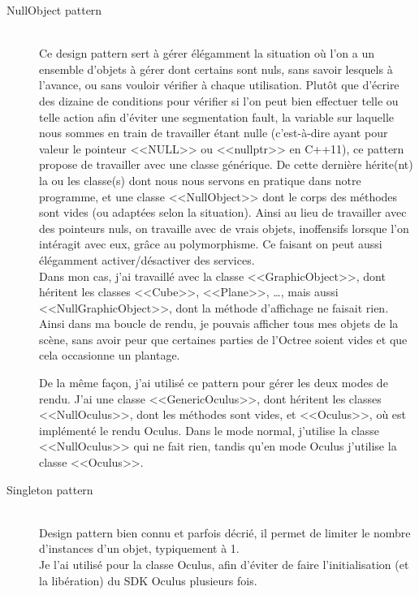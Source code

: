 \documentclass[a4paper,french,12pt]{article}
\begin{document}
	    \begin{description}
	    \item [NullObject pattern]~\\
		Ce design pattern sert à gérer élégamment la situation où l'on a un ensemble d'objets à gérer dont certains sont
		nuls, sans savoir lesquels à l'avance, ou sans vouloir vérifier à chaque utilisation. Plutôt que d'écrire des dizaine de conditions pour vérifier si l'on peut bien effectuer telle ou telle action
		afin d'éviter une segmentation fault, la variable sur laquelle nous sommes en train de travailler
		étant nulle (c'est-à-dire ayant pour valeur le pointeur <<NULL>> ou <<nullptr>> en C++11),
		ce pattern propose de travailler avec une classe générique. De cette dernière hérite(nt) la ou les classe(s) dont nous nous
		servons en pratique dans notre programme, et une classe <<NullObject>> dont le corps des méthodes sont vides (ou
		adaptées selon la situation).
		Ainsi au lieu de travailler avec des pointeurs nuls, on travaille avec de vrais objets, inoffensifs lorsque
		l'on intéragit avec eux, grâce au polymorphisme.
		Ce faisant on peut aussi élégamment activer/désactiver des services.\\

		Dans mon cas, j'ai travaillé avec la classe <<GraphicObject>>, dont héritent les classes <<Cube>>, <<Plane>>, \ldots,
		mais aussi <<NullGraphicObject>>, dont la méthode d'affichage ne faisait rien.
		Ainsi dans ma boucle de rendu, je pouvais afficher tous mes objets de la scène, sans avoir peur que certaines parties
		de l'Octree soient vides et que cela occasionne un plantage.


		De la même façon, j'ai utilisé ce pattern pour gérer les deux modes de rendu. J'ai une classe <<GenericOculus>>,
		dont héritent les classes <<NullOculus>>, dont les méthodes sont vides, et <<Oculus>>, où est implémenté
		le rendu Oculus. Dans le mode normal, j'utilise la classe <<NullOculus>> qui ne fait rien, tandis qu'en mode
		Oculus j'utilise la classe <<Oculus>>.

	    \item [Singleton pattern]~\\
		Design pattern bien connu et parfois décrié, il permet de limiter le nombre d'instances d'un objet, typiquement
		à 1.\\

		Je l'ai utilisé pour la classe Oculus, afin d'éviter de faire l'initialisation (et la libération) du SDK Oculus plusieurs fois.


\end{description}
\end{document}
